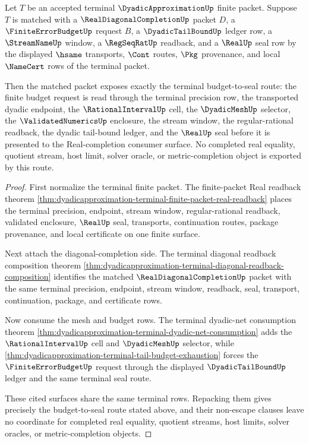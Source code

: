 \begin{theorem}
\label{thm:dyadic-approximation-terminal-tail-budget-real-completion-route}
Let $T$ be an accepted terminal $\DyadicApproximationUp$ finite packet. Suppose $T$ is matched with a $\RealDiagonalCompletionUp$ packet $D$, a $\FiniteErrorBudgetUp$ request $B$, a $\DyadicTailBoundUp$ ledger row, a $\StreamNameUp$ window, a $\RegSeqRatUp$ readback, and a $\RealUp$ seal row by the displayed $\hsame$ transports, $\Cont$ routes, $\Pkg$ provenance, and local $\NameCert$ rows of the terminal packet.

Then the matched packet exposes exactly the terminal budget-to-seal route: the finite budget request is read through the terminal precision row, the transported dyadic endpoint, the $\RationalIntervalUp$ cell, the $\DyadicMeshUp$ selector, the $\ValidatedNumericsUp$ enclosure, the stream window, the regular-rational readback, the dyadic tail-bound ledger, and the $\RealUp$ seal before it is presented to the Real-completion consumer surface. No completed real equality, quotient stream, host limit, solver oracle, or metric-completion object is exported by this route.
\end{theorem}
\begin{proof}
First normalize the terminal finite packet. The finite-packet Real readback theorem \autoref{thm:dyadicapproximation-terminal-finite-packet-real-readback} places the terminal precision, endpoint, stream window, regular-rational readback, validated enclosure, $\RealUp$ seal, transports, continuation routes, package provenance, and local certificate on one finite surface.

Next attach the diagonal-completion side. The terminal diagonal readback composition theorem \autoref{thm:dyadicapproximation-terminal-diagonal-readback-composition} identifies the matched $\RealDiagonalCompletionUp$ packet with the same terminal precision, endpoint, stream window, readback, seal, transport, continuation, package, and certificate rows.

Now consume the mesh and budget rows. The terminal dyadic-net consumption theorem \autoref{thm:dyadicapproximation-terminal-dyadic-net-consumption} adds the $\RationalIntervalUp$ cell and $\DyadicMeshUp$ selector, while \autoref{thm:dyadicapproximation-terminal-tail-budget-exhaustion} forces the $\FiniteErrorBudgetUp$ request through the displayed $\DyadicTailBoundUp$ ledger and the same terminal seal route.

These cited surfaces share the same terminal rows. Repacking them gives precisely the budget-to-seal route stated above, and their non-escape clauses leave no coordinate for completed real equality, quotient streams, host limits, solver oracles, or metric-completion objects.
\end{proof}
